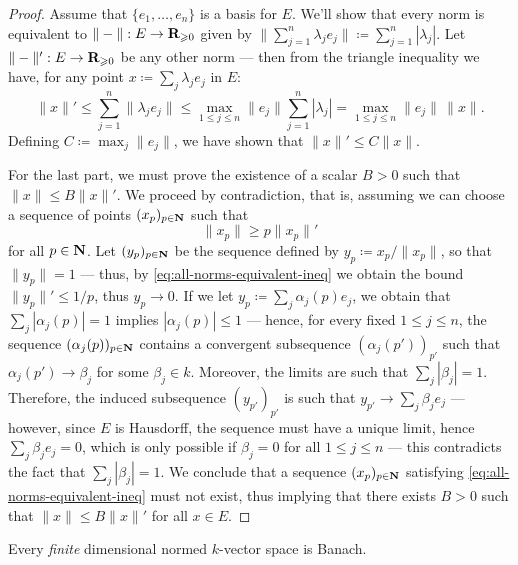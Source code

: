 \begin{proof}
Assume that \(\{e_1, \dots, e_n\}\) is a basis for \(E\). We'll show that every
norm is equivalent to \(\| - \|: E \to \mathbf{R}_{\geqslant 0}\) given by \(\| \sum_{j=1}^n
\lambda_j e_j \| \coloneq \sum_{j=1}^n |\lambda_j|\). Let \(\| - \|': E \to
\mathbf{R}_{\geqslant 0}\) be any other norm --- then from the triangle inequality we have,
for any point \(x \coloneq \sum_j \lambda_j e_j\) in \(E\):
\[
\| x \|'
\leq \sum_{j=1}^n \| \lambda_j e_j \|
\leq \max_{1 \leq j \leq n} \| e_j \| \sum_{j=1}^n |\lambda_j|
= \max_{1 \leq j \leq n} \| e_j \|\, \| x \|.
\]
Defining \(C \coloneq \max_j \| e_j \|\), we have shown that \(\| x \|' \leq C
\| x \|\).

For the last part, we must prove the existence of a scalar \(B > 0\) such that
\(\| x \| \leq B \| x \|'\). We proceed by contradiction, that is, assuming we
can choose a sequence of points \((x_p)_{p \in \mathbf{N}}\) such that
\begin{equation}\label{eq:all-norms-equivalent-ineq}
\| x_p \| \geq p \| x_p \|'
\end{equation}
for all \(p \in \mathbf{N}\). Let \((y_p)_{p \in \mathbf{N}}\) be the sequence defined by \(y_p
\coloneq x_p/\| x_p \|\), so that \(\| y_p \| = 1\) --- thus, by
\cref{eq:all-norms-equivalent-ineq} we obtain the bound \(\| y_p \|' \leq 1/p\),
thus \(y_p \to 0\). If we let \(y_p \coloneq \sum_j \alpha_j(p) e_j\), we obtain
that \(\sum_j |\alpha_j(p)| = 1\) implies \(|\alpha_j(p)| \leq 1\) --- hence,
for every fixed \(1 \leq j \leq n\), the sequence \((\alpha_j(p))_{p \in \mathbf{N}}\)
contains a convergent subsequence \((\alpha_j(p'))_{p'}\) such that
\(\alpha_{j}(p') \to \beta_j\) for some \(\beta_j \in k\). Moreover, the limits
are such that \(\sum_j |\beta_j| = 1\). Therefore, the induced subsequence
\((y_{p'})_{p'}\) is such that \(y_{p'} \to \sum_j \beta_j e_j\) --- however,
since \(E\) is Hausdorff, the sequence must have a unique limit, hence \(\sum_j
\beta_j e_j = 0\), which is only possible if \(\beta_j = 0\) for all \(1 \leq j
\leq n\) --- this contradicts the fact that \(\sum_j |\beta_j| = 1\). We
conclude that a sequence \((x_p)_{p \in \mathbf{N}}\) satisfying
\cref{eq:all-norms-equivalent-ineq} must not exist, thus implying that there
exists \(B > 0\) such that \(\| x \| \leq B \| x \|'\) for all \(x \in E\).
\end{proof}

\begin{corollary}
\label{cor:finite-dimensional-is-banach}
Every \emph{finite} dimensional normed \(k\)-vector space is Banach.
\end{corollary}

